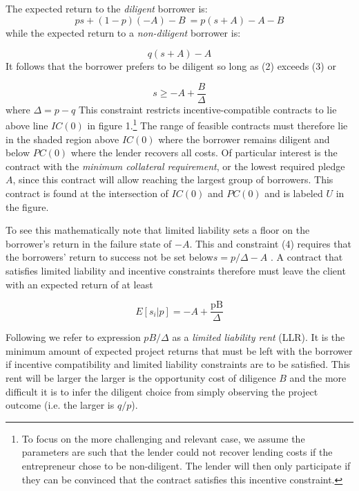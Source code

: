 \documentclass[letterpaper, 12pt]{article}
\begin{document}
The expected return to the \emph{diligent} borrower is:
\begin{equation}
ps + (1 - p)( - A) - B\
= p(s + A) - A - B
\end{equation}
while the expected return to a \emph{non-diligent} borrower is:

\begin{equation}
q(s + A) - A
\end{equation}
It follows that the borrower prefers to be diligent so long as (2)
exceeds (3) or

\begin{equation}
s \geq - A + \frac{B}{\Delta}
\end{equation}
where $\Delta=p-q$ This constraint restricts incentive-compatible
contracts to lie above line \(IC(0)\) in figure 1.\footnote{To focus on the more challenging and relevant case, we assume the parameters are such that the lender could not recover lending costs if the entrepreneur chose to be non-diligent. The lender will then only participate if they can be convinced that the contract satisfies this incentive constraint.} The range of feasible contracts must therefore lie in the
shaded region above \(IC(0)\) where the borrower remains diligent and
below \(PC(0)\) where the lender recovers all costs. Of particular
interest is the contract with the \emph{minimum collateral requirement},
or the lowest required pledge \(A\), since this contract will allow
reaching the largest group of borrowers\(.\) This contract is found at
the intersection of \(IC(0)\) and \(PC(0)\) and is labeled \(U\) in the
figure.

To see this mathematically note that limited liability sets a floor on
the borrower's return in the failure state of \(- A\). This and
constraint (4) requires that the borrowers' return to success not be set
below\(s = p/\Delta - A\) . A contract that satisfies limited liability
and incentive constraints therefore must leave the client with an
expected return of at least

\begin{equation}\label{ESP}
E\left\lbrack s_{i}|p \right\rbrack = - A + \frac{\text{pB}}{\Delta}  
\end{equation}


Following \citet{laffont2009} we refer to expression \(pB/\Delta\) as a \emph{limited liability rent} (LLR). It is the minimum amount of expected project returns that must be left with the borrower if incentive compatibility and limited liability constraints are to be satisfied. This rent will be larger the larger is the opportunity cost of diligence \(B\) and the more difficult it is to infer the diligent choice from simply observing the project outcome (i.e. the larger is $q/p$).
\end{document}
